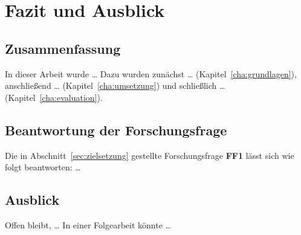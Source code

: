 \chapter{Fazit und Ausblick}
\label{cha:fazit}


\section{Zusammenfassung}
\label{sec:zusammenfassung}

In dieser Arbeit wurde \ldots{} Dazu wurden zunächst \ldots{} (Kapitel~\ref{cha:grundlagen}),
anschließend \ldots{} (Kapitel~\ref{cha:umsetzung}) und schließlich \ldots{}
(Kapitel~\ref{cha:evaluation}).

\section{Beantwortung der Forschungsfrage}
\label{sec:beantwortung}

Die in Abschnitt~\ref{sec:zielsetzung} gestellte Forschungsfrage \textbf{FF1} lässt sich
wie folgt beantworten: \ldots

\section{Ausblick}
\label{sec:ausblick}

Offen bleibt, \ldots{} In einer Folgearbeit könnte \ldots
